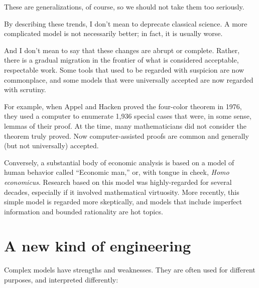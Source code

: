 \documentclass[10pt]{book}
\begin{document}
These are generalizations, of course, so we should not take them
too seriously.

By describing these trends, I don't mean to deprecate
classical science.  A more complicated model is not necessarily better;
in fact, it is usually worse.

And I don't mean to say that these changes are abrupt or complete.
Rather, there is a gradual migration in the frontier of what is
considered acceptable, respectable work.  Some tools that used
to be regarded with suspicion are now commonplace, and some 
models that were universally accepted are now regarded with scrutiny.

For example, when Appel and
Hacken proved the four-color theorem in 1976, they used a computer to
enumerate 1,936 special cases that were, in some sense, lemmas of
their proof.  At the time, many mathematicians did not
consider the theorem truly proved.  Now computer-assisted
proofs are common and generally (but not universally) accepted.

Conversely, a substantial body of economic analysis is based on
a model of human behavior called ``Economic man,'' or, with tongue
in cheek, {\em Homo economicus}.  Research based on this model
was highly-regarded for several decades, especially if it involved
mathematical virtuosity.  More recently, this simple model is
regarded more skeptically, and models that include imperfect
information and bounded rationality are hot topics.


\section{A new kind of engineering}

Complex models have strengths and weaknesses.  They are often used
for different purposes, and interpreted differently:
\end{document}
